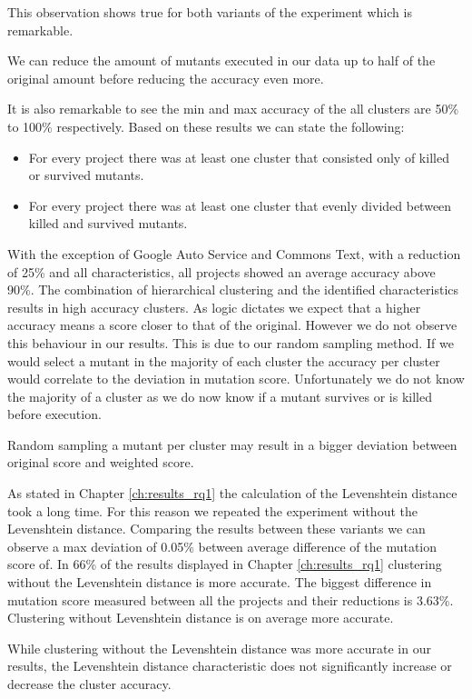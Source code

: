 \documentclass[../main]{subfiles}
\begin{document}
This observation shows true for both variants of the experiment which is remarkable.
\begin{finding}
    We can reduce the amount of mutants executed in our data up to half of the original amount before reducing the accuracy even more.
\end{finding}
It is also remarkable to see the min and max accuracy of the all clusters are 50\% to 100\% respectively.
Based on these results we can state the following:
\begin{itemize}
    \item For every project there was at least one cluster that consisted only of killed or survived mutants.
    \item For every project there was at least one cluster that evenly divided between killed and survived mutants.
\end{itemize}
With the exception of Google Auto Service and Commons Text, with a reduction of 25\% and all characteristics, all projects showed an average accuracy above 90\%.
The combination of hierarchical clustering and the identified characteristics results in high accuracy clusters.
As logic dictates we expect that a higher accuracy means a score closer to that of the original.
However we do not observe this behaviour in our results.
This is due to our random sampling method.
If we would select a mutant in the majority of each cluster the accuracy per cluster would correlate to the deviation in mutation score.
Unfortunately we do not know the majority of a cluster as we do now know if a mutant survives or is killed before execution.
\begin{finding}
    Random sampling a mutant per cluster may result in a bigger deviation between original score and weighted score.
\end{finding}
As stated in Chapter \ref{ch:results_rq1} the calculation of the Levenshtein distance took a long time.
For this reason we repeated the experiment without the Levenshtein distance.
Comparing the results between these variants we can observe a max deviation of 0.05\% between average difference of the mutation score of.
In 66\% of the results displayed in Chapter \ref{ch:results_rq1} clustering without the Levenshtein distance is more accurate.
The biggest difference in mutation score measured between all the projects and their reductions is 3.63\%.
Clustering without Levenshtein distance is on average more accurate.
\begin{finding}
    While clustering without the Levenshtein distance was more accurate in our results, the Levenshtein distance characteristic does not significantly increase or decrease the cluster accuracy.
\end{finding}
\end{document}
